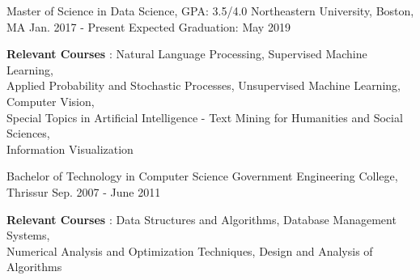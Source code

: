 \vspace{-0.1cm}
\vspace{-2mm}
\begin{cventries}
  \cventry
    {Master of Science in Data Science, GPA: 3.5/4.0}
    {Northeastern University, Boston, MA}
    {Jan. 2017 - Present}
    {Expected Graduation: May 2019 }
    {
      \begin{cvitems}
      \item {\textbf{Relevant Courses} : Natural Language Processing, Supervised Machine Learning, \\ Applied Probability and Stochastic Processes, Unsupervised Machine Learning, Computer Vision, \\Special Topics in Artificial Intelligence - Text Mining for Humanities and Social Sciences, \\ Information Visualization}
      \end{cvitems}
    }
      \cventry
    {Bachelor of Technology in Computer Science}
    {Government Engineering College, Thrissur}
    {Sep. 2007 - June 2011}
    {}
    {
      \begin{cvitems}
      \item {\textbf{Relevant Courses} : Data Structures and Algorithms, Database Management Systems, \\
          Numerical Analysis and Optimization Techniques, Design and Analysis of Algorithms}
      \end{cvitems}
    }
\end{cventries}

